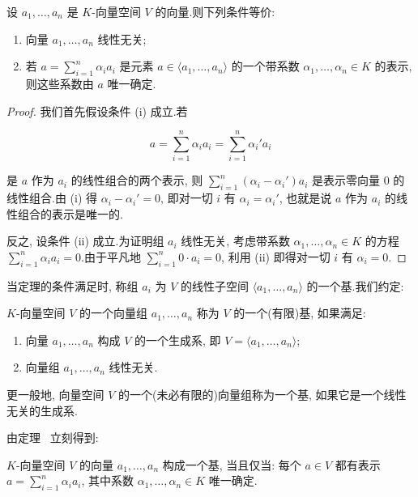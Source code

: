 \begin{theorem}[线性无关与唯一表示]\label{thm:1.5.2}
设 $a_1, \ldots, a_n$ 是 $K$-向量空间 $V$ 的向量.则下列条件等价:
\begin{enumerate}
\item[(i)] 向量 $a_1, \ldots, a_n$ 线性无关;
\item[(ii)] 若 $a = \sum_{i = 1}^{n} \alpha_i a_i$ 是元素 $a \in \langle a_1, \ldots, a_n \rangle$ 的一个带系数 $\alpha_1, \ldots, \alpha_n \in K$ 的表示, 则这些系数由 $a$ 唯一确定.
\end{enumerate}
\end{theorem}

\begin{proof}
我们首先假设条件 (i) 成立.若

\[
a = \sum_{i = 1}^{n} \alpha_i a_i = \sum_{i = 1}^{n} \alpha_i' a_i
\]

是 $a$ 作为 $a_i$ 的线性组合的两个表示, 则 $\sum_{i = 1}^{n} (\alpha_i - \alpha_i') a_i$ 是表示零向量 $0$ 的线性组合.由 (i) 得 $\alpha_i - \alpha_i' = 0$, 即对一切 $i$ 有 $\alpha_i = \alpha_i'$, 也就是说 $a$ 作为 $a_i$ 的线性组合的表示是唯一的.

反之, 设条件 (ii) 成立.为证明组 $a_i$ 线性无关, 考虑带系数 $\alpha_1, \ldots, \alpha_n \in K$ 的方程 $\sum_{i = 1}^{n} \alpha_i a_i = 0$.由于平凡地 $\sum_{i = 1}^{n} 0 \cdot a_i = 0$, 利用 (ii) 即得对一切 $i$ 有 $\alpha_i = 0$.
\end{proof}

当定理的条件满足时, 称组 $a_i$ 为 $V$ 的线性子空间 $\langle a_1, \ldots, a_n \rangle$ 的一个基.我们约定:

\begin{definition}[基]\label{def:1.5.3}
$K$-向量空间 $V$ 的一个向量组 $a_1, \ldots, a_n$ 称为 $V$ 的一个(有限)基, 如果满足:
\begin{enumerate}
\item[(i)] 向量 $a_1, \ldots, a_n$ 构成 $V$ 的一个生成系, 即 $V = \langle a_1, \ldots, a_n \rangle$;
\item[(ii)] 向量组 $a_1, \ldots, a_n$ 线性无关.
\end{enumerate}
\end{definition}

更一般地, 向量空间 $V$ 的一个(未必有限的)向量组称为一个基, 如果它是一个线性无关的生成系.

由定理~ 立刻得到:

\begin{remark}[基的刻画]\label{rem:1.5.4}
$K$-向量空间 $V$ 的向量 $a_1, \ldots, a_n$ 构成一个基, 当且仅当: 每个 $a \in V$ 都有表示 $a = \sum_{i = 1}^{n} \alpha_i a_i$, 其中系数 $\alpha_1, \ldots, \alpha_n \in K$ 唯一确定.
\end{remark}

